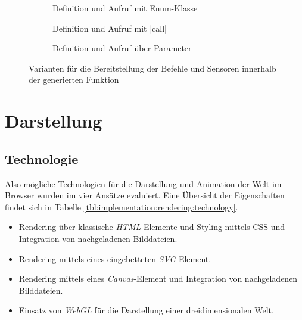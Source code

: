 \begin{figure}
  \begin{subfigure}[b]{\textwidth}
    
    \caption{Definition und Aufruf mit Enum-Klasse}
    \label{fig:implementation:program:environment:func}
    \vspace{0.5cm}
  \end{subfigure}
  \begin{subfigure}[b]{\textwidth}
    
    \caption{Definition und Aufruf mit \inlinec|call|}
    \label{fig:implementation:program:environment:this}
    \vspace{0.5cm}
  \end{subfigure}
  \begin{subfigure}[b]{\textwidth}
    
    \caption{Definition und Aufruf über Parameter}
    \label{fig:implementation:program:environment:param}
  \end{subfigure}
  \caption{Varianten für die Bereitstellung der Befehle und Sensoren innerhalb der generierten Funktion}
  \label{fig:implementation:program:environment}
\end{figure}


\section{Darstellung}
\label{sec:implementation:rendering}

\TODO{}

\subsection{Technologie}
\label{sec:implementation:rendering:technology}

Also mögliche Technologien für die Darstellung und Animation der Welt im Browser wurden im vier Ansätze evaluiert. Eine Übersicht der Eigenschaften findet sich in Tabelle \ref{tbl:implementation:rendering:technology}.

\begin{itemize}
  \item Rendering über klassische \emph{HTML}-Elemente und Styling mittels CSS und Integration von nachgeladenen Bilddateien.
  \item Rendering mittels eines eingebetteten \emph{SVG}-Element.
  \item Rendering mittels eines \emph{Canvas}-Element und Integration von nachgeladenen Bilddateien.
  \item Einsatz von \emph{WebGL} für die Darstellung einer dreidimensionalen Welt.
\end{itemize}

